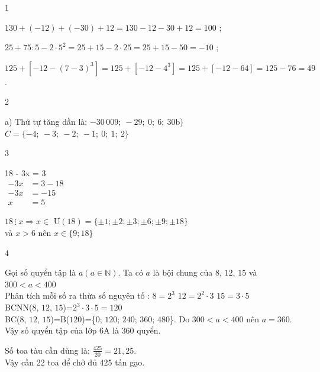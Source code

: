 \begin{Solbook}{1}
 \par \noindent  \begin {listEX} \item $130 + (-12) + (-30) + 12 = 130 - 12 - 30 + 12 = 100$ ; \item $25 + 75 : 5 - 2 \cdot 5^{2} = 25 + 15 - 2 \cdot 25 = 25 + 15 - 50 = -10$ ; \item $125 + \left [-12 - (7 - 3)^{3}\right ] = 125 + \left [-12 - 4^{3}\right ] = 125 + \left [-12 - 64\right ] = 125 - 76 = 49$. \end {listEX}  \hfill \qedEX 
\end{Solbook}
\begin{Solbook}{2}
 \par \noindent a) Thứ tự tăng dần là: $-30\,009 ;\ -29 ;\ 0 ;\ 6 ;\ 30$\qquad b) $C = \{-4;\ -3;\ -2;\ -1;\ 0;\ 1;\ 2\}$  \hfill \qedEX 
\end{Solbook}
\begin{Solbook}{3}
 \par \noindent  \begin {listEX}[2] \item 18 - 3x = 3\\ \hspace *{0.5 cm}$\begin {aligned} -3x &= 3 - 18\\ -3x &= -15\\ x &= 5 \end {aligned}$ \item $18\ \vdots \ x \Rightarrow x \in $ Ư$(18)=\{\pm 1;\pm 2;\pm 3;\pm 6;\pm 9;\pm 18\}$\\ và $ x> 6$ nên $x \in \{9;18\}$ \end {listEX}  \hfill \qedEX 
\end{Solbook}
\begin{Solbook}{4}
 \par \noindent  \begin {listEX} \item Gọi số quyển tập là $a (a\in \mathbb {N})$. Ta có $a$ là bội chung của $8$, $12$, $15$ và $300 < a< 400$\\ Phân tích mỗi số ra thừa số nguyên tố : $8=2^3$ \hspace {1cm} $12=2^2\cdot 3$ \hspace {1cm} $15=3\cdot 5$\\ BCNN($8$, $12$, $15$)=$2^3\cdot 3\cdot 5=120$\\ BC($8$, $12$, $15$)=B($120$)=\{$0$; $120$; $240$; $360$; $480$\}. Do $300 < a< 400$ nên $a=360$.\\ Vậy số quyển tập của lớp 6A là $ 360$ quyển. \item Số toa tàu cần dùng là: $\frac {425}{20} = 21{,}25$.\\ Vậy cần 22 toa để chở đủ 425 tấn gạo. \end {listEX} \par  \hfill \qedEX 
\end{Solbook}
